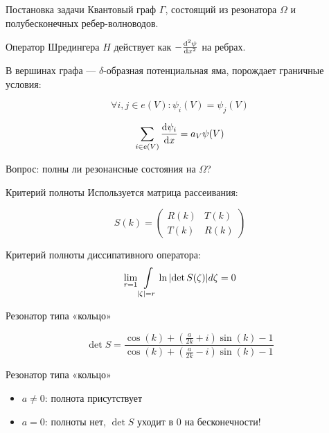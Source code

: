 \documentclass{beamer}
\begin{document}
% 
\begin{frame}{Постановка задачи}
Квантовый граф $\Gamma$, состоящий из резонатора $\Omega$ и полубесконечных ребер-волноводов.

Оператор Шредингера $H$ действует как $-\dv[2]{\psi}{x}$ на ребрах.

В вершинах графа — $\delta$-образная потенциальная яма, порождает граничные условия:

\[
\forall i, j \in e(V): \psi_i(V) = \psi_j(V)
\]

\[
\sum\limits_{i \in e(V)} \dv{\psi_i}{x} (V) = a_V \psi(V)
\]

Вопрос: полны ли резонансные состояния на $\Omega$?
\end{frame}


\begin{frame}{Критерий полноты}
Используется матрица рассеивания:

\[
S(k) = \begin{pmatrix} R(k) & T(k) \\ T(k) & R(k) \end{pmatrix}
\]

Критерий полноты диссипативного оператора:
\[
\lim\limits_{r = 1} \int\limits_{\abs{\zeta} = r} \ln \abs{\det S(\zeta)} d \zeta = 0
\]

\end{frame}


\begin{frame}{Резонатор типа «кольцо»}

\begin{figure}
\begin{tikzpicture}[scale=0.5]

\end{tikzpicture}
\end{figure}

\[
\det S = 
\frac
{\cos\left(k\right) + {\left(\frac{a}{2 k} + i\right)} \sin\left(k\right) - 1}
{\cos\left(k\right) + {\left(\frac{a}{2 k} - i\right)} \sin\left(k\right) - 1}
\]

\end{frame}

\begin{frame}{Резонатор типа «кольцо»}
\begin{itemize}
\item $a \ne 0$: полнота присутствует
\item $a = 0$: полноты нет, $\det S$ уходит в 0 на бесконечности! 
\end{itemize}

\end{frame}
\end{document}

